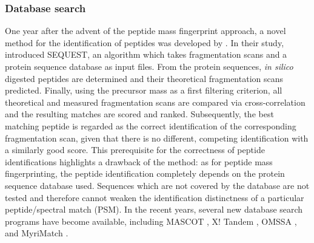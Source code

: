 \subsubsection{Database search}

One year after the advent of the peptide mass fingerprint approach, a novel
method for the identification of peptides was developed by \citet{Eng1994}.
In their study, \citeauthor{Eng1994} introduced SEQUEST, an algorithm which
takes fragmentation scans and a protein sequence database as input files.
From the protein sequences, {\em in silico} digested peptides are determined
and their theoretical fragmentation scans predicted.
Finally, using the precursor mass as a first filtering criterion, all
theoretical and measured fragmentation scans are compared via cross-correlation
and the resulting matches are scored and ranked.
Subsequently, the best matching peptide is regarded as the correct 
identification of the corresponding fragmentation scan, given that there is
no different, competing identification with a similarly good score.
This prerequisite for the correctness of peptide identifications highlights
a drawback of the method: as for peptide mass fingerprinting, the peptide
identification completely depends on the protein sequence database used.
Sequences which are not covered by the database are not tested and therefore
cannot weaken the identification distinctness of a particular peptide/spectral 
match (PSM).
In the recent years, several new database search programs have become 
available, including MASCOT \citep{Perkins1999}, X! Tandem \citep{Craig2004},
OMSSA \citep{Geer2004}, and MyriMatch \citep{Tabb2007}.

